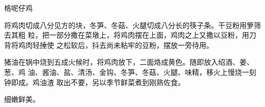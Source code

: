%
%
%
%
%
%
%
\begin{recipe}{格呢仔鸡}

\ingredients


\preparation

将鸡肉切成八分见方的块，冬笋、冬菇、火腿切成八分长的筷子条。干豆粉用箩筛去其粗
粒，把一部分撒在菜墩上，将鸡肉摆在上面，鸡肉之上又撒以豆粉，用刀背将鸡肉轻捶使
之松软后，抖去尚未粘牢的豆粉，摆放一旁待用。

猪油在锅中烧到五成火候时，将鸡肉放下，二面烙成黄色。随即放入绍酒、姜、葱、鸡
油、酱油、盐、清汤、金钩、冬笋、冬菇、火腿、味精，移火上慢烧一刻钟即成。鸡油渣
取出不要，另以季节鲜菜煮到刚熟佐食。

\features

细嫩鲜美。

\end{recipe}

